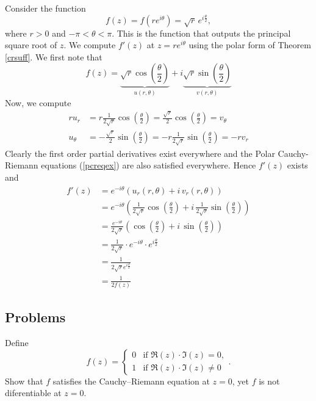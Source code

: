 \begin{example}
Consider the function
\[f(z) = f(re^{i\theta}) = \sqrt{r}\,e^{i\frac{\theta}{2}} ,\]
where $r > 0$ and $-\pi < \theta < \pi$. This is the function that outputs the principal square root of $z$. We compute $f'(z)$ at $z = re^{i\theta}$ using the polar form of Theorem \ref{crsuff}. We first note that
\[f(z) = \underbrace{\sqrt{r}\cos\left(\frac{\theta}{2}\right)}_{u(r,\theta)} + i\underbrace{\sqrt{r}\sin\left(\frac{\theta}{2}\right)}_{v(r,\theta)}\]
Now, we compute
\begin{align*}
ru_r &= r\frac{1}{2\sqrt{r}}\cos\left(\frac{\theta}{2}\right) = \frac{\sqrt{r}}{2}\cos\left(\frac{\theta}{2}\right) = v_\theta\\[0.5em]
u_\theta &= -\frac{\sqrt{r}}{2}\sin\left(\frac{\theta}{2}\right) = -r\frac{1}{2\sqrt{r}}\sin\left(\frac{\theta}{2}\right) = -rv_r
\end{align*}
Clearly the first order partial derivatives exist everywhere and the Polar Cauchy-Riemann equations (\ref{pcreqex}) are also satisfied everywhere. Hence $f'(z)$ exists and
\begin{align*}
f'(z) &= e^{-i\theta}(u_r(r,\theta) + i\,v_r(r,\theta))\\[0.5em]
&= e^{-i\theta}\left(\frac{1}{2\sqrt{r}}\cos\left(\frac{\theta}{2}\right) + i\,\frac{1}{2\sqrt{r}}\sin\left(\frac{\theta}{2}\right)\right)\\[0.5em]
&= \frac{e^{-i\theta}}{2\sqrt{r}}\left(\cos\left(\frac{\theta}{2}\right) + i\,\sin\left(\frac{\theta}{2}\right)\right)\\[0.5em]
&= \frac{1}{2\sqrt{r}}\cdot e^{-i\theta}\cdot e^{i\frac{\theta}{2}}\\[0.5em]
&= \frac{1}{2\sqrt{r}e^{i\frac{\theta}{2}}}\\[0.5em]
&= \frac{1}{2f(z)}
\end{align*}
\end{example}

\vspace*{2em}

\subsection{Problems}
\vspace{0.1in}

\begin{problem}\label{prob 7.1}
Define 
\[f(z) = \begin{cases} 0 & \text{if }\Re(z)\cdot \Im(z) = 0,\\[0.5em] 1 & \text{if } \Re(z)\cdot \Im(z) \neq 0\end{cases}.\]
Show that $f$ satisfies the Cauchy–Riemann equation at $z = 0$, yet $f$ is not diferentiable at $z = 0$.
\end{problem}

